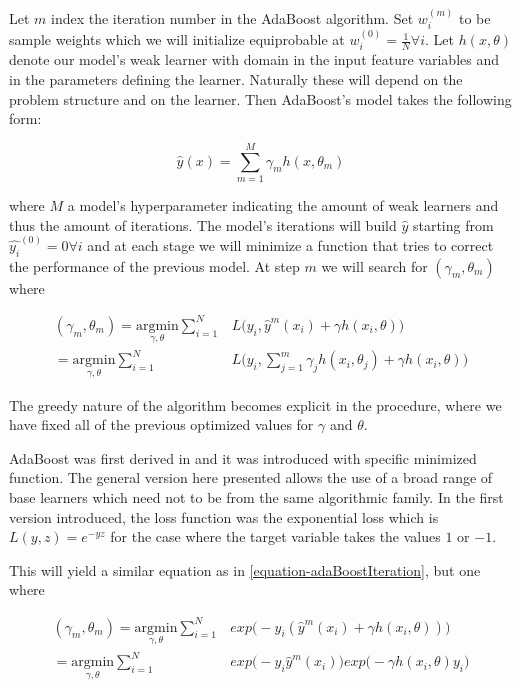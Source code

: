 Let $m$ index the iteration number in the AdaBoost algorithm. Set $w^{(m)}_i$ to be sample weights which we will initialize equiprobable at $w^{(0)}_i = \frac{1}{N} \forall i$. Let $h(x,\theta)$  denote our model's weak learner with domain in the input feature variables and in the parameters defining the learner. Naturally these will depend on the problem structure and on the learner. Then AdaBoost's model takes the following form:

\begin{equation} \label{equation-adaBoostModel}
\hat{y}(x) = \sum_{m=1}^{M} \gamma_m h(x,\theta_m)
\end{equation}

where $M$ a model's hyperparameter indicating the amount of weak learners and thus the amount of iterations. The model's iterations will build $\hat{y}$ starting from $\hat{y_i}^{(0)}= 0 \forall i$ and at each stage we will minimize a function that tries to correct the performance of the previous model. At step $m$ we will search for $(\gamma_{m}, \theta_{m})$ where

\begin{equation} \label{equation-adaBoostIteration}
\begin{split}
(\gamma_{m}, \theta_{m}) = \underset{\gamma, \theta}{\mathrm{argmin}}  \sum_{i=1}^{N} & L\big( y_i,   \hat{y}^{m}(x_i) + \gamma h(x_i,\theta) \big) \\
= \underset{\gamma, \theta}{\mathrm{argmin}} \sum_{i=1}^{N}  & L\big( y_i,    \sum_{j=1}^{m} \gamma_j h(x_i,\theta_j) + \gamma h(x_i,\theta) \big) 
 \end{split}
\end{equation}

The greedy nature of the algorithm becomes explicit in the procedure, where we have fixed all of the previous optimized values for $\gamma$ and $\theta$. 

AdaBoost was first derived in \cite{schapire-adaBoost} and it was introduced with specific  minimized function. The general version here presented allows the use of a broad range of base learners which need not to be from the same algorithmic family. In the first version introduced, the loss function was the exponential loss which is $L(y,z) = e^{-yz}$ for the case where the target variable takes the values $1$ or $-1$.

This will yield a similar equation as in \ref{equation-adaBoostIteration}, but one where

\begin{equation} \label{equation-adaBoostExponentialIteration}
\begin{split}
(\gamma_{m}, \theta_{m}) = \underset{\gamma, \theta}{\mathrm{argmin}}  \sum_{i=1}^{N} & exp\big( -y_i  (\hat{y}^{m}(x_i) + \gamma h(x_i,\theta) )\big) \\
= \underset{\gamma, \theta}{\mathrm{argmin}}  \sum_{i=1}^{N} & exp\big( -y_i  \hat{y}^{m}(x_i)\big) exp\big(- \gamma h(x_i,\theta)y_i \big) 
\end{split}
\end{equation}

